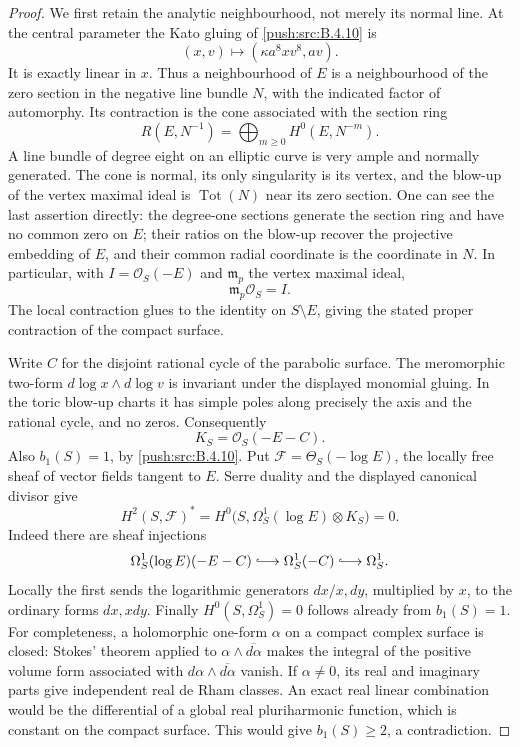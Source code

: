 \begin{proof}
We first retain the analytic neighbourhood, not merely its normal
line.  At the central parameter the Kato gluing of \ref{push:src:B.4.10} is
\[
 (x,v)\longmapsto(\kappa a^8xv^8,av).
\]
It is exactly linear in $x$.  Thus a neighbourhood of $E$ is a
neighbourhood of the zero section in the negative line bundle
$N$, with the indicated factor of automorphy.
Its contraction is the cone associated with the section ring
\[
 R(E,N^{-1})=\bigoplus_{m\ge0}H^0(E,N^{-m}).
\]
A line bundle of degree eight on an elliptic curve is very ample
and normally generated.  The cone is normal, its only singularity
is its vertex, and the blow-up of the vertex maximal ideal is
$\operatorname{Tot}(N)$ near its zero section.
One can see the last assertion directly: the degree-one sections
generate the section ring and have no common zero on $E$;
their ratios on the blow-up recover the projective embedding of
$E$, and their common radial coordinate is the coordinate in $N$.
In particular, with $I=\mathcal O_S(-E)$ and $\mathfrak m_p$ the
vertex maximal ideal,
\[
 \mathfrak m_p\mathcal O_S=I.
\]
The local contraction glues to the identity on $S\setminus E$,
giving the stated proper contraction of the compact surface.

Write $C$ for the disjoint rational cycle of the parabolic surface.
The meromorphic two-form
$d\log x\wedge d\log v$ is invariant under the displayed
monomial gluing.  In the toric blow-up charts it has simple poles
along precisely the axis and the rational cycle, and no zeros.
Consequently
\[
 K_S=\mathcal O_S(-E-C).
\]
Also $b_1(S)=1$, by \ref{push:src:B.4.10}.
Put $\mathcal F=\Theta_S(-\log E)$, the locally free sheaf of
vector fields tangent to $E$.
Serre duality and the displayed canonical divisor give
\[
 H^2(S,\mathcal F)^*
 =H^0\bigl(S,\Omega^1_S(\log E)\otimes K_S\bigr)=0.
\]
Indeed there are sheaf injections
\[
 \Omega^1_S(\log E)(-E-C)
       \lhook\joinrel\longrightarrow\Omega^1_S(-C)
       \lhook\joinrel\longrightarrow\Omega^1_S.
\]
Locally the first sends the logarithmic generators
$dx/x,dy$, multiplied by $x$, to the ordinary forms $dx,xdy$.
Finally $H^0(S,\Omega^1_S)=0$ follows already from $b_1(S)=1$.
For completeness, a holomorphic one-form $\alpha$ on a compact
complex surface is closed: Stokes' theorem applied to
$\alpha\wedge\overline{d\alpha}$ makes the integral of the
positive volume form associated with
$d\alpha\wedge\overline{d\alpha}$ vanish.
If $\alpha\ne0$, its real and imaginary parts give independent
real de Rham classes.  An exact real linear combination would
be the differential of a global real pluriharmonic function,
which is constant on the compact surface.  This would give
$b_1(S)\ge2$, a contradiction.


\end{proof}
